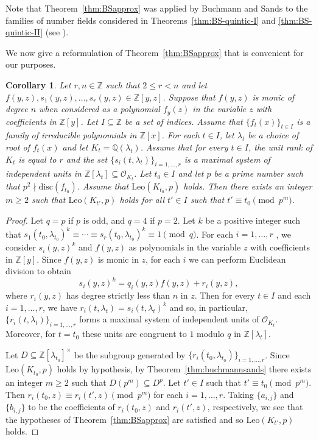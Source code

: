 \documentclass[12pt]{amsart}
\theoremstyle{plain}
\newtheorem{corollary}[theorem]{Corollary}
\theoremstyle{remark}
\theoremstyle{definition}
\newcommand{\Z}{\mathbb{Z}}
\newcommand{\Q}{\mathbb{Q}}
\newcommand{\Leo}{\mathrm{Leo}}
\numberwithin{equation}{section}
\begin{document}
Note that Theorem~\ref{thm:BSapprox} was applied by Buchmann and Sands to the families of number fields considered in Theorems~\ref{thm:BS-quintic-I} and \ref{thm:BS-quintic-II} (see \cite[Corollaries 4.3 and 4.5]{MR958040}).

We now give a reformulation of Theorem~\ref{thm:BSapprox} that is convenient for our purposes.

\begin{corollary}\label{cor:familyapprox}
Let $r,n \in \Z$ such that $2 \leq r < n$ and 
let $f(y,z),s_{1}(y,z), \ldots, s_{r}(y,z) \in \Z[y,z]$. 
Suppose that $f(y,z)$ is monic of degree $n$ when considered as a polynomial $f_{y}(z)$
in the variable $z$ with coefficients in $\Z[y]$.
Let $I \subseteq \Z$ be a set of indices. 
Assume that $\{ f_{t}(x) \}_{t \in I}$ is a family of irreducible polynomials in $\Z[x]$. 
For each $t \in I$, let $\lambda_{t}$ be a choice of root of $f_{t}(x)$ and let $K_{t}=\Q(\lambda_{t})$.
Assume that for every $t\in I$, the unit rank of $K_{t}$ is equal to $r$ 
and the set $\{s_i(t,\lambda_t)\}_{i=1,...,r}$ is a maximal system of independent units in
$\Z[\lambda_t]\subseteq \mathcal{O}_{K_{t}}$. 
Let $t_{0} \in I$ and let $p$ be a prime number such that $p^{2}\nmid \mathrm{disc}(f_{t_0})$.
Assume that $\Leo(K_{t_{0}},p)$ holds. 
Then there exists an integer $m \geq 2$ such that $\Leo(K_{t'},p)$ holds
for all $t' \in I$ such that $t'\equiv t_{0}\pmod {p^m}$.
\end{corollary}

\begin{proof}
Let $q=p$ if $p$ is odd, and $q=4$ if $p=2$. 
Let $k$ be a positive integer such that
$s_{1}(t_{0},\lambda_{t_{0}})^{k} \equiv \cdots \equiv s_{r}(t_{0},\lambda_{t_{0}})^{k} \equiv 1 \pmod{q}$.
For each  $i=1,\dots,r$ , we consider $s_{i}(y,z)^{k}$ and $f(y,z)$ as polynomials in the variable $z$ with coefficients in $\Z[y]$. Since $f(y,z)$ is monic in $z$, for each $i$ we can perform Euclidean division to obtain
\[
 s_{i}(y,z)^{k} = q_{i}(y,z)f(y,z)+r_{i}(y,z),
\]
where $r_{i}(y,z)$ has degree strictly less than $n$ in $z$. 
Then for every $t \in I$ and each $i=1,\ldots,r$, we have $r_{i}(t,\lambda_t)=s_{i}(t,\lambda_{t})^{k}$ and so, 
in particular, $\{r_i(t,\lambda_t)\}_{i=1,\dots,r}$ forms a maximal system of independent units of
$\mathcal{O}_{K_{t}}$.
Moreover, for $t=t_{0}$ these units are congruent to $1$ modulo $q$ in $\Z[\lambda_{t}]$.

Let $D \subseteq \Z[\lambda_{t_0}]^{\times}$ be the subgroup generated by 
$\{r_{i}(t_{0},\lambda_{t_0})\}_{i=1,\dots,r}$. 
Since $\Leo(K_{t_0},p)$ holds by hypothesis, by Theorem~\ref{thm:buchmannsands}
there exists an integer $m \geq 2$ such that $D(p^{m})\subseteq D^{p}$.
Let $t' \in I$ such that $t' \equiv {t_{0}} \pmod{p^{m}}$.
Then $r_{i}(t_0,z)\equiv r_{i}(t',z)\pmod {p^{m}}$ for each $i=1,\ldots,r$.
Taking $\{a_{i,j}\}$ and $\{b_{i,j}\}$ to be the coefficients of $r_{i}(t_0,z)$ and $r_{i}(t',z)$, respectively,
we see that the hypotheses of Theorem~\ref{thm:BSapprox} are satisfied and so
$\Leo(K_{t'},p)$ holds.
\end{proof}
\end{document}
